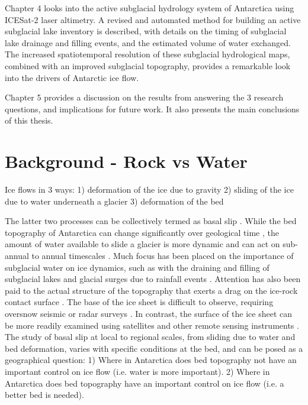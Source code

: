 Chapter 4 looks into the active subglacial hydrology system of Antarctica using ICESat-2 laser altimetry.
A revised and automated method for building an active subglacial lake inventory is described, with details on the timing of subglacial lake drainage and filling events, and the estimated volume of water exchanged.
The increased spatiotemporal resolution of these subglacial hydrological maps, combined with an improved subglacial topography, provides a remarkable look into the drivers of Antarctic ice flow.

Chapter 5 provides a discussion on the results from answering the 3 research questions, and implications for future work.
It also presents the main conclusions of this thesis.


\section{Background - Rock vs Water}

Ice flows in 3 ways:
1) deformation of the ice due to gravity
2) sliding of the ice due to water underneath a glacier
3) deformation of the bed

The latter two processes can be collectively termed as basal slip \citep{Cuffeyphysicsglaciers2010}.
While the bed topography of Antarctica can change significantly over geological time \citep[e.g.]{HochmuthEvolvingPaleobathymetryCircum2020}, the amount of water available to slide a glacier is more dynamic and can act on sub-annual to annual timescales \citep[e.g.][]{SiegfriedEpisodicicevelocity2016}.
Much focus has been placed on the importance of subglacial water on ice dynamics, such as with the draining and filling of subglacial lakes \citep[e.g.][]{Smithinventoryactivesubglacial2009,SiegfriedThirteenyearssubglacial2018} and glacial surges due to rainfall events \citep{IkenUpliftUnteraargletscherBeginning1983}.
Attention has also been paid to the actual structure of the topography that exerts a drag on the ice-rock contact surface \citep[e.g.][]{Kyrke-SmithRelevanceDetailBasal2018}.
The base of the ice sheet is difficult to observe, requiring oversnow seismic or radar surveys \citep[e.g.][]{HolschuhLinkingpostglaciallandscapes2020}.
In contrast, the surface of the ice sheet can be more readily examined using satellites and other remote sensing instruments \citep[e.g.][]{HowatReferenceElevationModel2019,MouginotContinentWideInterferometric2019}.
The study of basal slip at local to regional scales, from sliding due to water and bed deformation, varies with specific conditions at the bed, and can be posed as a geographical question:  %
1) Where in Antarctica does bed topography not have an important control on ice flow (i.e. water is more important).
2) Where in Antarctica does bed topography have an important control on ice flow (i.e. a better bed is needed).

